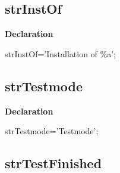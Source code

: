 \documentclass{report}
\newif\ifpdf
\begin{document}
\subsection*{strInstOf}
\fi
\label{trstrings-strInstOf}
\begin{list}{}{
\setlength{\itemindent}{0cm}
\setlength{\listparindent}{0cm}
\setlength{\leftmargin}{\evensidemargin}
\addtolength{\leftmargin}{\tmplength}
\settowidth{\labelsep}{X}
\addtolength{\leftmargin}{\labelsep}
\setlength{\labelwidth}{\tmplength}
}
\item[\textbf{Declaration}\hfill]
\ifpdf
\begin{flushleft}
\fi
\begin{ttfamily}
strInstOf='Installation of {\%}a';\end{ttfamily}

\ifpdf
\end{flushleft}
\fi

\end{list}
\ifpdf
\subsection*{\large{\textbf{strTestmode}}\normalsize\hspace{1ex}\hrulefill}
\else
\subsection*{strTestmode}
\fi
\label{trstrings-strTestmode}
\begin{list}{}{
\setlength{\itemindent}{0cm}
\setlength{\listparindent}{0cm}
\setlength{\leftmargin}{\evensidemargin}
\addtolength{\leftmargin}{\tmplength}
\settowidth{\labelsep}{X}
\addtolength{\leftmargin}{\labelsep}
\setlength{\labelwidth}{\tmplength}
}
\item[\textbf{Declaration}\hfill]
\ifpdf
\begin{flushleft}
\fi
\begin{ttfamily}
strTestmode='Testmode';\end{ttfamily}

\ifpdf
\end{flushleft}
\fi

\end{list}
\ifpdf
\subsection*{\large{\textbf{strTestFinished}}\normalsize\hspace{1ex}\hrulefill}
\else
\end{document}
